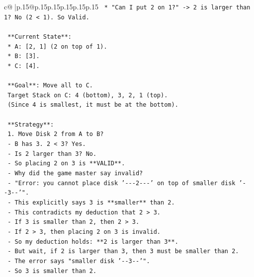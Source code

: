 \documentclass{article}
\begin{document}
{\begin{supertabular}{c@{$\;$}|p{.15\linewidth}@{}p{.15\linewidth}p{.15\linewidth}p{.15\linewidth}p{.15\linewidth}p{.15\linewidth}}
{{{\texttt{                *   "Can I put 2 on 1?" {-}> 2 is larger than 1? No (2 < 1). So Valid.} \\
\\ 
\texttt{                **Current State**:} \\
\texttt{                *   A: {[}2, 1{]} (2 on top of 1).} \\
\texttt{                *   B: {[}3{]}.} \\
\texttt{                *   C: {[}4{]}.} \\
\\ 
\texttt{                **Goal**: Move all to C.} \\
\texttt{                Target Stack on C: 4 (bottom), 3, 2, 1 (top).} \\
\texttt{                (Since 4 is smallest, it must be at the bottom).} \\
\\ 
\texttt{                **Strategy**:} \\
\texttt{                1. Move Disk 2 from A to B?} \\
\texttt{                   {-} B has 3. 2 < 3? Yes.} \\
\texttt{                   {-} Is 2 larger than 3? No.} \\
\texttt{                   {-} So placing 2 on 3 is **VALID**.} \\
\texttt{                   {-} Why did the game master say invalid?} \\
\texttt{                   {-} "Error: you cannot place disk '{-}{-}{-}2{-}{-}{-}' on top of smaller disk '{-}{-}3{-}{-}'".} \\
\texttt{                   {-} This explicitly says 3 is **smaller** than 2.} \\
\texttt{                   {-} This contradicts my deduction that 2 > 3.} \\
\texttt{                   {-} If 3 is smaller than 2, then 2 > 3.} \\
\texttt{                   {-} If 2 > 3, then placing 2 on 3 is invalid.} \\
\texttt{                   {-} So my deduction holds: **2 is larger than 3**.} \\
\texttt{                   {-} But wait, if 2 is larger than 3, then 3 must be smaller than 2.} \\
\texttt{                   {-} The error says "smaller disk '{-}{-}3{-}{-}'".} \\
\texttt{                   {-} So 3 is smaller than 2.} \\
}}}
\end{supertabular}}
\end{document}

